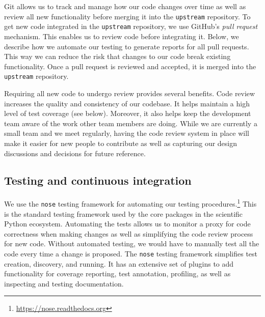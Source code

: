 \documentclass[]{article}
\begin{document}
Git allows us to track and manage how our code changes over time as well as
review all new functionality before merging it into the \texttt{upstream}
repository.
To get new code integrated in the \texttt{upstream} repository, we use GitHub's
\emph{pull request} mechanism.
This enables us to review code before integrating it.
Below, we describe how we automate our testing to generate reports for all pull
requests.
This way we can reduce the risk that changes to our code break existing
functionality.
Once a pull request is reviewed and accepted, it is merged into the
\texttt{upstream} repository.

Requiring all new code to undergo review provides several benefits.
Code review increases the quality and consistency of our codebase.
It helps maintain a high level of test coverage (see below).
Moreover, it also helps keep the development team aware of the work other team
members are doing.
While we are currently a small team and we meet regularly, having the code
review system in place will make it easier for new people to contribute as well
as capturing our design discussions and decisions for future reference.

\subsection{\label{sec:test}Testing and continuous integration}

We use the \texttt{nose} testing framework for automating our testing
procedures.\footnote{\url{https://nose.readthedocs.org}}
This is the standard testing framework used by the core packages in the
scientific Python ecosystem.
Automating the tests allows us to monitor a proxy for code correctness when
making changes as well as simplifying the code review process for new code.
Without automated testing, we would have to manually test all the code every
time a change is proposed.
The \texttt{nose} testing framework simplifies test creation, discovery, and
running.
It has an extensive set of plugins to add functionality for coverage reporting,
test annotation, profiling, as well as inspecting and testing documentation.
\end{document}
